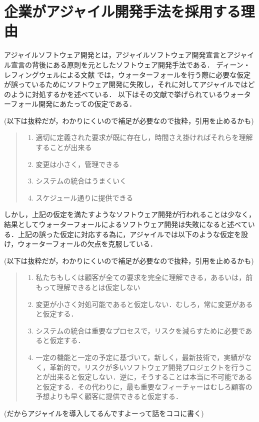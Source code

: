 \section{企業がアジャイル開発手法を採用する理由}

アジャイルソフトウェア開発とは，アジャイルソフトウェア開発宣言\cite{agile_declarationアジャイルソフトウェア開発宣言}とアジャイル宣言の背後にある原則\cite{agile_principleアジャイル宣言の背後にある原則}を元としたソフトウェア開発手法である．
ディーン・レフィングウェルによる文献 \cite{leffingwell2010アジャイル開発の本質とスケールアップ}では，ウォーターフォールを行う際に必要な仮定が誤っているためにソフトウェア開発に失敗し，それに対してアジャイルではどのように対処するかを述べている．
以下はその文献で挙げられているウォーターフォール開発にあたっての仮定である．

(以下は抜粋だが，わかりにくいので補足が必要なので抜粋，引用を止めるかも)

\begin{quote}
  \begin{enumerate}
    \item 適切に定義された要求が既に存在し，時間さえ掛ければそれらを理解することが出来る
    \item 変更は小さく，管理できる
    \item システムの統合はうまくいく
    \item スケジュール通りに提供できる
  \end{enumerate}
\end{quote}

しかし，上記の仮定を満たすようなソフトウェア開発が行われることは少なく，結果としてウォーターフォールによるソフトウェア開発は失敗になると述べている．上記の誤った仮定に対応する為に，アジャイルでは以下のような仮定を設け，ウォーターフォールの欠点を克服している．

(以下は抜粋だが，わかりにくいので補足が必要なので抜粋，引用を止めるかも)

\begin{quote}
  \begin{enumerate}
    \item 私たちもしくは顧客が全ての要求を完全に理解できる，あるいは，前もって理解できるとは仮定しない
    \item 変更が小さく対処可能であると仮定しない．むしろ，常に変更があると仮定する．
    \item システムの統合は重要なプロセスで，リスクを減らすために必要であると仮定する．
    \item 一定の機能と一定の予定に基づいて，新しく，最新技術で，実績がなく，革新的で，リスクが多いソフトウェア開発プロジェクトを行うことが出来ると仮定しない．逆に，そうすることは本当に不可能であると仮定する．その代わりに，最も重要なフィーチャーはむしろ顧客の予想よりも早く顧客に提供できると仮定する．
  \end{enumerate}
\end{quote}

(だからアジャイルを導入してるんですよーって話をココに書く)
